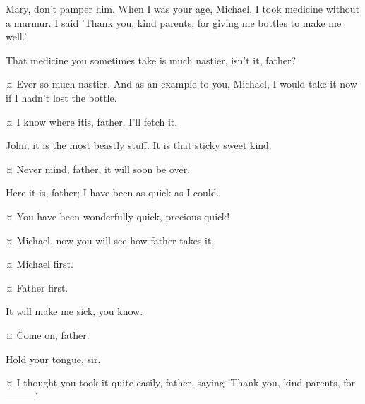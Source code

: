 \begin{drama}
\mrdarlingspeaks
Mary, don't pamper him.
When I was your age, Michael, I took medicine without a murmur.
I said 'Thank you, kind parents, for giving me bottles to make me well.'


\wendyspeaks
That medicine you sometimes take is much nastier, isn't it, father?

\mrdarlingspeaks {}¤
Ever so much nastier.
And as an example to you, Michael, I would take it now
if I hadn't lost the bottle.

\wendyspeaks {}¤
I know where itis, father.
I'll fetch it.


\mrdarlingspeaks
John, it is the most beastly stuff.
It is that sticky sweet kind.

\johnspeaks {}¤
Never mind, father, it will soon be over.


\wendyspeaks
Here it is, father; I have been as quick as I could.

\mrdarlingspeaks {}¤
You have been wonderfully quick, precious quick!


\wendyspeaks {}¤
Michael, now you will see how father takes it.

\mrdarlingspeaks {}¤
Michael first.

\michaelspeaks {}¤
Father first.

\mrdarlingspeaks
It will make me sick, you know.

\johnspeaks {}¤
Come on, father.

\mrdarlingspeaks
Hold your tongue, sir.

\wendyspeaks {}¤
I thought you took it quite easily, father, saying 'Thank you, kind parents, for———'


\end{drama}
